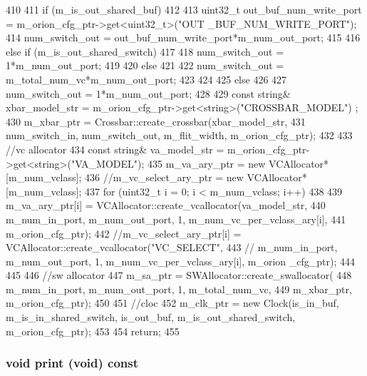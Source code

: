 \begin{DoxyCode}
{410     {
411         if (m_is_out_shared_buf)
412         {
413             uint32_t out_buf_num_write_port = m_orion_cfg_ptr->get<uint32_t>("OUT
      _BUF_NUM_WRITE_PORT");
414             num_switch_out = out_buf_num_write_port*m_num_out_port;
415         }
416         else if (m_is_out_shared_switch)
417         {
418             num_switch_out = 1*m_num_out_port;
419         }
420         else
421         {
422             num_switch_out = m_total_num_vc*m_num_out_port;
423         }
424     }
425     else
426     {
427         num_switch_out = 1*m_num_out_port;
428     }
429     const string& xbar_model_str = m_orion_cfg_ptr->get<string>("CROSSBAR_MODEL")
      ;
430     m_xbar_ptr = Crossbar::create_crossbar(xbar_model_str, 
431             num_switch_in, num_switch_out, m_flit_width, m_orion_cfg_ptr);
432 
433     //vc allocator
434     const string& va_model_str = m_orion_cfg_ptr->get<string>("VA_MODEL");
435     m_va_ary_ptr = new VCAllocator* [m_num_vclass];
436     //m_vc_select_ary_ptr = new VCAllocator* [m_num_vclass];
437     for (uint32_t i = 0; i < m_num_vclass; i++)
438     {
439         m_va_ary_ptr[i] = VCAllocator::create_vcallocator(va_model_str,
440                 m_num_in_port, m_num_out_port, 1, m_num_vc_per_vclass_ary[i],
441                 m_orion_cfg_ptr);
442         //m_vc_select_ary_ptr[i] = VCAllocator::create_vcallocator("VC_SELECT",
443         //  m_num_in_port, m_num_out_port, 1, m_num_vc_per_vclass_ary[i], m_orion
      _cfg_ptr);
444     }
445 
446     //sw allocator
447     m_sa_ptr = SWAllocator::create_swallocator(
448             m_num_in_port, m_num_out_port, 1, m_total_num_vc, 
449             m_xbar_ptr, m_orion_cfg_ptr);
450 
451     //cloc
452     m_clk_ptr = new Clock(is_in_buf, m_is_in_shared_switch, is_out_buf, 
      m_is_out_shared_switch, m_orion_cfg_ptr);
453 
454     return;
455 }
\end{DoxyCode}
\hypertarget{classOrionRouter_a3a3ab31c19c38fe926198ddc4a0a4a91}{
\subsubsection[{print}]{\setlength{\rightskip}{0pt plus 5cm}void print (void) const}}
\label{classOrionRouter_a3a3ab31c19c38fe926198ddc4a0a4a91}



